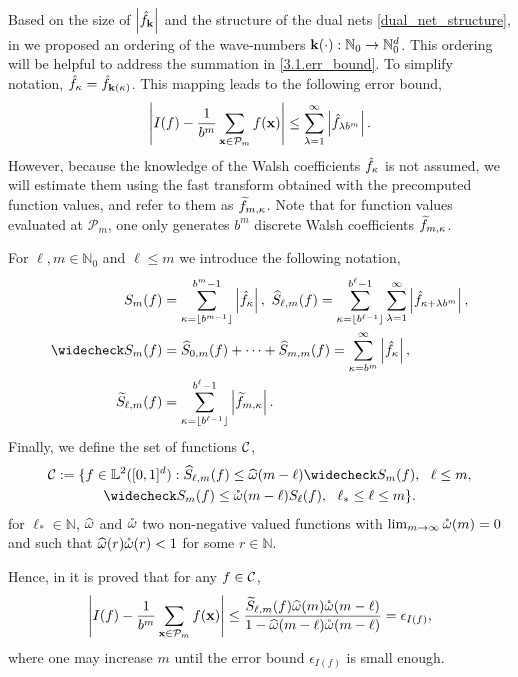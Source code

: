 Based on the size of $\left\lvert\hat{f}_{\boldsymbol{\mathbf{k}}}\right\rvert$ and the structure of the dual nets \eqref{dual_net_structure}, in \cite[Sec. 4.1]{HicJim} we proposed an ordering of the wave-numbers $\boldsymbol{\mathbf{k}}(\cdot):\mathbb{N}_0\rightarrow\mathbb{N}_0^d$. This ordering will be helpful to address the summation in \eqref{3.1.err_bound}. To simplify notation, $\hat{f}_{\kappa}=\hat{f}_{\boldsymbol{\mathbf{k}}(\kappa)}$. This mapping leads to the following error bound,
\begin{equation}
\left\lvert I(f) - \frac{1}{b^m}\sum_{\boldsymbol{\mathbf{x}}\in\mathcal{P}_m}f(\boldsymbol{\mathbf{x}})\right\rvert \le \sum_{\lambda=1}^{\infty} \left \lvert \hat{f}_{\lambda b^m}\right \rvert.
\end{equation}
However, because the knowledge of the Walsh coefficients $\hat{f}_{\kappa}$ is not assumed, we will estimate them using the fast transform obtained with the precomputed function values, and refer to them as $\widetilde{f}_{m,\kappa}$. Note that for function values evaluated at $\mathcal{P}_m$, one only generates $b^m$ discrete Walsh coefficients $\widetilde{f}_{m,\kappa}$.

For $\ell,m \in \mathbb{N}_0$ and $\ell \le m$ we introduce the following notation,
\begin{align*}
S_m(f) &=  \sum_{\kappa=\left \lfloor b^{m-1} \right \rfloor}^{b^{m}-1} \absolute{\hf_{\kappa}}, \ 
\hS_{\ell,m}(f)  = \sum_{\kappa=\left \lfloor b^{\ell-1} \right \rfloor}^{b^{\ell}-1} \sum_{\lambda=1}^{\infty} \absolute{ \hf_{\kappa+\lambda b^{m}}}, \\
\wcS_m(f)&=\hS_{0,m}(f) + \cdots + \hS_{m,m}(f)=
\sum_{\kappa=b^{m}}^{\infty} \absolute{\hf_{\kappa}},\\ 
\tS_{\ell,m}(f) &= \sum_{\kappa=\left \lfloor b^{\ell-1}\right \rfloor}^{b^{\ell}-1} \absolute{\tf_{m,\kappa}}.
\end{align*}
Finally, we define the set of functions $\mathcal{C}$,
\begin{multline} \label{conecond}
\cc:=\{f \in \mathbb{L}^2(\cube) : \hS_{\ell,m}(f) \le \homega(m-\ell) \wcS_m(f),\ \ \ell \le m, \\
\wcS_m(f) \le \wcomega(m-\ell) S_{\ell}(f),\ \  \ell_* \le \ell \le m\}.
\end{multline}
for $\ell_* \in \mathbb{N}$, $\widehat{\omega}$ and $\mathring{\omega}$ two non-negative valued functions with $\lim_{m \to \infty} \mathring{\omega}(m) = 0$ and such that $\widehat{\omega}(r)\mathring{\omega}(r)<1$ for some $r\in\mathbb{N}$.

Hence, in \cite[Sec. 4.2]{HicJim} it is proved that for any $f\in\mathcal{C}$,
\begin{equation}
\left\lvert I(f) - \frac{1}{b^m}\sum_{\boldsymbol{\mathbf{x}}\in\mathcal{P}_m}f(\boldsymbol{\mathbf{x}})\right\rvert
\le \frac{\widetilde{S}_{\ell,m}(f)\widehat{\omega}(m) \mathring{\omega}(m-\ell)}{1 - \widehat{\omega}(m-\ell) \mathring{\omega}(m-\ell)}=\epsilon_{I(f)}, \label{errbd}
\end{equation}
where one may increase $m$ until the error bound $\epsilon_{I(f)}$ is small enough.

